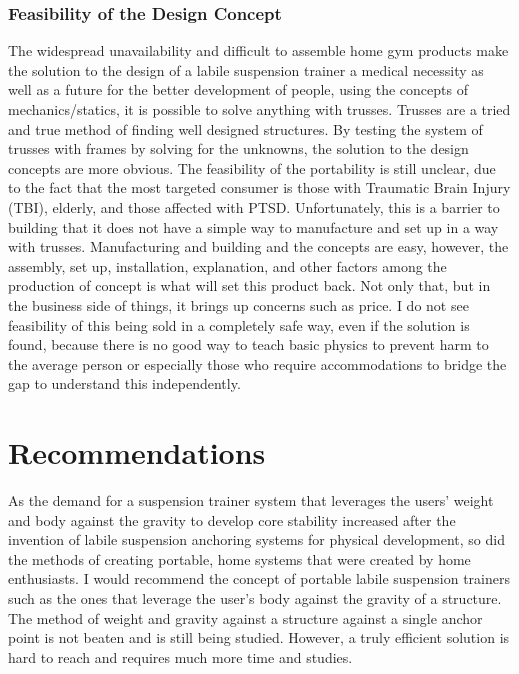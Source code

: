 \subsection{Feasibility of the Design Concept}
	The widespread unavailability and difficult to assemble home gym products make the solution to the design of a labile suspension trainer a medical necessity as well as a future for the better development of people, using the concepts of mechanics/statics, it is possible to solve anything with trusses. Trusses are a tried and true method of finding well designed structures. By testing the system of trusses with frames by solving for the unknowns, the solution to the design concepts are more obvious. The feasibility of the portability is still unclear, due to the fact that the most targeted consumer is those with Traumatic Brain Injury (TBI), elderly, and those affected with PTSD. Unfortunately, this is a barrier to building that it does not have a simple way to manufacture and set up in a way with trusses. Manufacturing and building and the concepts are easy, however, the assembly, set up, installation, explanation, and other factors among the production of concept is what will set this product back. Not only that, but in the business side of things, it brings up concerns such as price. I do not see feasibility of this being sold in a completely safe way, even if the solution is found, because there is no good way to teach basic physics to prevent harm to the average person or especially those who require accommodations to bridge the gap to understand this independently.
\chapter{Recommendations}
	As the demand for a suspension trainer system that leverages the users' weight and body against the gravity to develop core stability increased after the invention of labile suspension anchoring systems for physical development, so did the methods of creating portable, home systems that were created by home enthusiasts. I would recommend the concept of portable labile suspension trainers such as the ones that leverage the user's body against the gravity of a structure. The method of weight and gravity against a structure against a single anchor point is not beaten and is still being studied. However, a truly efficient solution is hard to reach and requires much more time and studies.